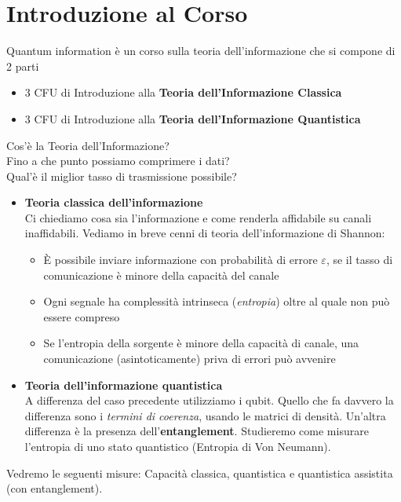 \chapter*{Introduzione al Corso}

Quantum information è un corso sulla teoria dell'informazione che si compone di 2 parti
\begin{itemize}
	\item 3 CFU di Introduzione alla \textbf{Teoria dell'Informazione Classica}
	\item 3 CFU di Introduzione alla \textbf{Teoria dell'Informazione Quantistica}
\end{itemize}
Cos'è la Teoria dell'Informazione?\\
Fino a che punto possiamo comprimere i dati?\\
Qual'è il miglior tasso di trasmissione possibile?
\begin{itemize}
	\item \textbf{Teoria classica dell'informazione}
	\\ Ci chiediamo cosa sia l'informazione e come renderla affidabile su canali inaffidabili. Vediamo in breve cenni di teoria dell'informazione di Shannon:
	\begin{itemize}
		\item È possibile inviare informazione con probabilità di errore $\varepsilon$, se il tasso di comunicazione è minore della capacità del canale
		\item Ogni segnale ha complessità intrinseca (\textit{entropia}) oltre al quale non può essere compreso
		\item Se l'entropia della sorgente è minore della capacità di canale, una comunicazione (asintoticamente) priva di errori può avvenire
	\end{itemize}
	\item  \textbf{Teoria dell'informazione quantistica}
	\\A differenza del caso precedente utilizziamo i qubit. Quello che fa davvero la differenza sono i \textit{termini di coerenza}, usando le matrici di densità. 
	Un'altra differenza è la presenza dell'\textbf{entanglement}.
	Studieremo come misurare l'entropia di uno stato quantistico (Entropia di Von Neumann).
\end{itemize}
Vedremo le seguenti misure: Capacità classica, quantistica e quantistica assistita (con entanglement).
